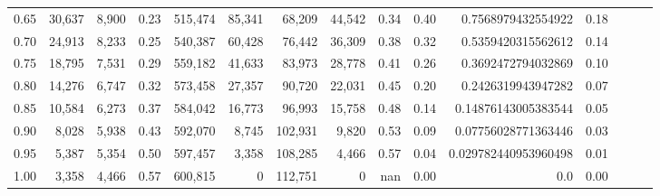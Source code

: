 \begin{tabular}{rrrrrrrrrrrrrrr}
0.65 &  30,637 &  8,900 &  0.23 &  515,474 &   85,341 &   68,209 &   44,542 &  0.34 &  0.40 &    0.7568979432554922 &      0.18 \\
0.70 &  24,913 &  8,233 &  0.25 &  540,387 &   60,428 &   76,442 &   36,309 &  0.38 &  0.32 &    0.5359420315562612 &      0.14 \\
0.75 &  18,795 &  7,531 &  0.29 &  559,182 &   41,633 &   83,973 &   28,778 &  0.41 &  0.26 &    0.3692472794032869 &      0.10 \\
0.80 &  14,276 &  6,747 &  0.32 &  573,458 &   27,357 &   90,720 &   22,031 &  0.45 &  0.20 &    0.2426319943947282 &      0.07 \\
0.85 &  10,584 &  6,273 &  0.37 &  584,042 &   16,773 &   96,993 &   15,758 &  0.48 &  0.14 &   0.14876143005383544 &      0.05 \\
0.90 &   8,028 &  5,938 &  0.43 &  592,070 &    8,745 &  102,931 &    9,820 &  0.53 &  0.09 &   0.07756028771363446 &      0.03 \\
0.95 &   5,387 &  5,354 &  0.50 &  597,457 &    3,358 &  108,285 &    4,466 &  0.57 &  0.04 &  0.029782440953960498 &      0.01 \\
1.00 &   3,358 &  4,466 &  0.57 &  600,815 &        0 &  112,751 &        0 &   nan &  0.00 &                   0.0 &      0.00 \\
\bottomrule
\end{tabular}
